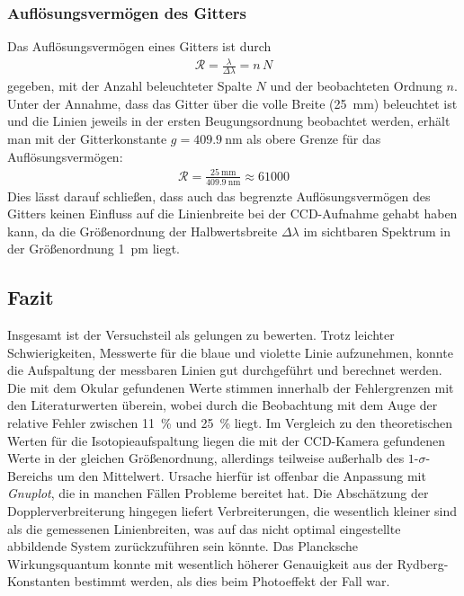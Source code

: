 \documentclass[11pt, a4paper]{article}
\numberwithin{equation}{section}
\begin{document}
\subsubsection{Auflösungsvermögen des Gitters}
Das Auflösungsvermögen eines Gitters ist durch
\begin{align*}
\mathcal{R}=\frac{\lambda}{\Delta\lambda}=n\,N
\end{align*}
gegeben, mit der Anzahl beleuchteter Spalte $N$ und der beobachteten Ordnung $n$. Unter der Annahme, dass das Gitter über die volle Breite (\SI{25}{\milli\metre}) beleuchtet ist und die Linien jeweils in der ersten Beugungsordnung beobachtet werden, erhält man mit der Gitterkonstante $g=\SI{409.9}{\nano\metre}$ als obere Grenze für das Auflösungsvermögen:
\begin{align*}
\mathcal{R} = \frac{\SI{25}{\milli\metre}}{\SI{409.9}{\nano\metre}} \approx 61000
\end{align*}
Dies lässt darauf schließen, dass auch das begrenzte Auflösungsvermögen des Gitters keinen Einfluss auf die Linienbreite bei der CCD-Aufnahme gehabt haben kann, da die Größenordnung der Halbwertsbreite $\Delta \lambda$ im sichtbaren Spektrum in der Größenordnung \SI{1}{\pico\metre} liegt.

\subsection{Fazit}
Insgesamt ist der Versuchsteil als gelungen zu bewerten.
Trotz leichter Schwierigkeiten, Messwerte für die blaue und violette Linie aufzunehmen, konnte die Aufspaltung der messbaren Linien gut durchgeführt und berechnet werden.
Die mit dem Okular gefundenen Werte stimmen innerhalb der Fehlergrenzen mit den Literaturwerten überein, wobei durch die Beobachtung mit dem Auge der relative Fehler zwischen \SI{11}{\percent} und \SI{25}{\percent} liegt.
Im Vergleich zu den theoretischen Werten für die Isotopieaufspaltung liegen die mit der CCD-Kamera gefundenen Werte in der gleichen Größenordnung, allerdings teilweise außerhalb des $1$-$\sigma$-Bereichs um den Mittelwert.
Ursache hierfür ist offenbar die Anpassung mit \textit{Gnuplot}, die in manchen Fällen Probleme bereitet hat.
Die Abschätzung der Dopplerverbreiterung hingegen liefert Verbreiterungen, die wesentlich kleiner sind als die gemessenen Linienbreiten, was auf das nicht optimal eingestellte abbildende System zurückzuführen sein könnte.
Das Plancksche Wirkungsquantum konnte mit wesentlich höherer Genauigkeit aus der Rydberg-Konstanten bestimmt werden, als dies beim Photoeffekt der Fall war.
\end{document}
